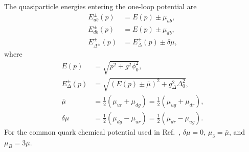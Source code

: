 The quasiparticle energies entering the one-loop potential are
\begin{align}
E_{ub}^{\pm}(p) &= E(p)\pm\mu_{ub}, \\
E_{db}^{\pm}(p) &= E(p)\pm\mu_{db}, \\
E_{\Delta^\pm}^{\pm}(p) &= E_\Delta^\pm(p)\pm\delta\mu,
\end{align}
where
\begin{align}
E(p) &= \sqrt{p^2+g^2\phi_0^2}, \\
E_\Delta^\pm(p)
&=
\sqrt{\left(E(p)\pm\bar{\mu}\right)^2
+
g_\Delta^2\Delta_0^2},
\\
\bar{\mu}
&=
\frac{1}{2}\left(\mu_{ur}+\mu_{dg}\right)
=
\frac{1}{2}\left(\mu_{ug}+\mu_{dr}\right),
\\
\delta\mu
&=
\frac{1}{2}\left(\mu_{dg}-\mu_{ur}\right)
=
\frac{1}{2}\left(\mu_{dr}-\mu_{ug}\right).
\end{align}
For the common quark chemical potential used in Ref.~\cite{Andersen2024},
\(\delta\mu=0\), \(\mu_3=\bar{\mu}\), and \(\mu_B=3\bar{\mu}\).

